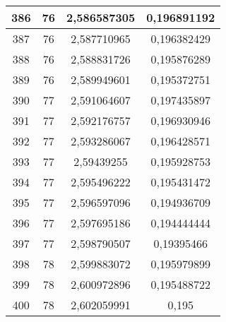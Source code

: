 {\begin{minipage}[!h]{0.45\textwidth}
\begin{longtable}{cccc}
386 & 76 & 2,586587305 & 0,196891192 \\ \hline
387 & 76 & 2,587710965 & 0,196382429 \\ \hline
388 & 76 & 2,588831726 & 0,195876289 \\ \hline
389 & 76 & 2,589949601 & 0,195372751 \\ \hline
390 & 77 & 2,591064607 & 0,197435897 \\ \hline
391 & 77 & 2,592176757 & 0,196930946 \\ \hline
392 & 77 & 2,593286067 & 0,196428571 \\ \hline
393 & 77 & 2,59439255 & 0,195928753 \\ \hline
394 & 77 & 2,595496222 & 0,195431472 \\ \hline
395 & 77 & 2,596597096 & 0,194936709 \\ \hline
396 & 77 & 2,597695186 & 0,194444444 \\ \hline
397 & 77 & 2,598790507 & 0,19395466 \\ \hline
398 & 78 & 2,599883072 & 0,195979899 \\ \hline
399 & 78 & 2,600972896 & 0,195488722 \\ \hline
400 & 78 & 2,602059991 & 0,195 \\ \hline
\end{longtable}
\end{minipage}

}
